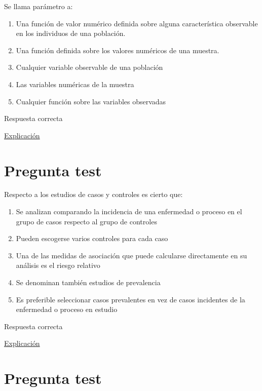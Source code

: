 \documentclass[
]{book}
\providecommand{\tightlist}{%
  \setlength{\itemsep}{0pt}\setlength{\parskip}{0pt}}
\begin{document}
Se llama parámetro a:

\begin{enumerate}
\def\labelenumi{\alph{enumi})}
\tightlist
\item
  Una función de valor numérico definida sobre alguna característica observable en los individuos de una población.
\item
  Una función definida sobre los valores numéricos de una muestra.
\item
  Cualquier variable observable de una población
\item
  Las variables numéricas de la muestra
\item
  Cualquier función sobre las variables observadas
\end{enumerate}

Respuesta correcta

\href{https://1fjmanzano.github.io/bioestadistica/conceptos-previos.html}{Explicación}

\hypertarget{pregunta-test-27}{%
\section{Pregunta test}\label{pregunta-test-27}}

Respecto a los estudios de casos y controles es cierto que:

\begin{enumerate}
\def\labelenumi{\alph{enumi})}
\tightlist
\item
  Se analizan comparando la incidencia de una enfermedad o proceso en el grupo de casos respecto al grupo de controles
\item
  Pueden escogerse varios controles para cada caso
\item
  Una de las medidas de asociación que puede calcularse directamente en su análisis es el riesgo relativo
\item
  Se denominan también estudios de prevalencia
\item
  Es preferible seleccionar casos prevalentes en vez de casos incidentes de la enfermedad o proceso en estudio
\end{enumerate}

Respuesta correcta

\href{https://dsp.facmed.unam.mx/wp-content/uploads/2022/02/Anexo-1C-U-9-Estudios-de-casos-y-controles.-Argimon-J.pdf}{Explicación}

\hypertarget{pregunta-test-28}{%
\section{Pregunta test}\label{pregunta-test-28}}
\end{document}
